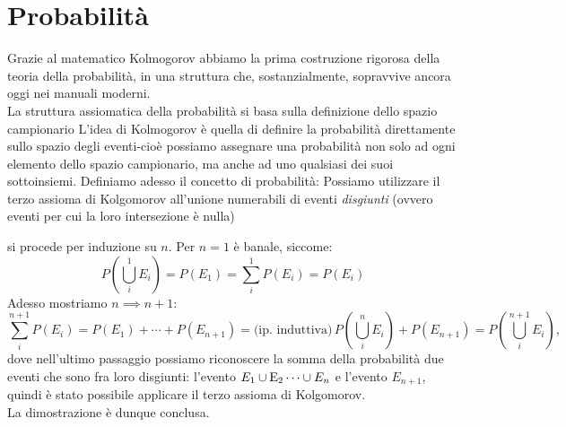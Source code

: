 \documentclass{report}
\begin{document}
	\chapter{Probabilità}
	Grazie al matematico Kolmogorov abbiamo la prima costruzione rigorosa della teoria della probabilità, in una struttura che, sostanzialmente, sopravvive ancora oggi nei manuali moderni. \\
	La struttura assiomatica della probabilità si basa sulla definizione dello spazio campionario
\noindent L'idea di Kolmogorov è quella di definire la probabilità direttamente sullo spazio degli eventi-cioè possiamo assegnare una probabilità non solo ad ogni elemento dello spazio campionario, ma anche ad uno qualsiasi dei suoi sottoinsiemi.
	Definiamo adesso il concetto di probabilità:
\noindent Possiamo utilizzare il terzo assioma di Kolgomorov all'unione numerabili di eventi \emph{disgiunti} (ovvero eventi per cui la loro intersezione è nulla)
	\begin{myproof}
	si procede per induzione su $n$. Per $n = 1$ è banale, siccome:
	$$
		P \left( \bigcup_i^1 E_i \right) = P(E_1) = \sum_i^1 P(E_i) = P(E_i)
	$$
	Adesso mostriamo $n \implies n+1$:
	$$
		\sum_i^{n+1} P(E_i) = P(E_1) + \cdots + P(E_{n+1}) = \text{(ip. induttiva)} \, P \left(\bigcup_i^n E_i \right) + P(E_{n+1}) = P \left( \bigcup_{i}^{n+1} E_i \right),
	$$
	dove nell'ultimo passaggio possiamo riconoscere la somma della probabilità due eventi che sono fra loro disgiunti: l'evento $E_1 \cup \operatorname{E}_2 \cdots \cup E_n$ e l'evento $E_{n+1}$, quindi è stato possibile applicare il terzo assioma di Kolgomorov. \\
	La dimostrazione è dunque conclusa.
	\end{myproof}
\end{document}
